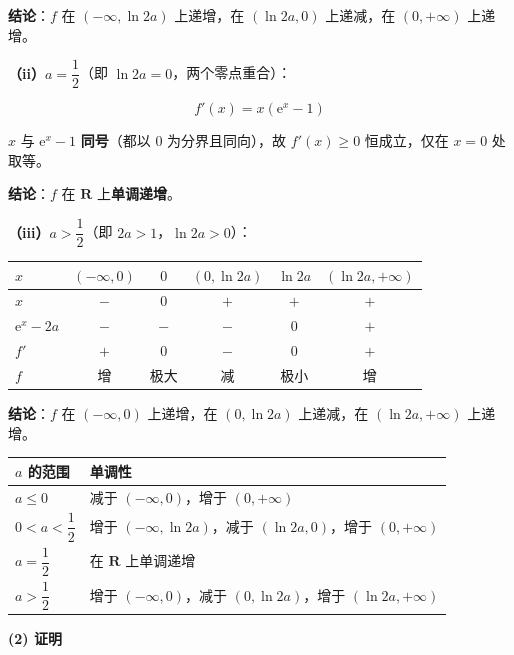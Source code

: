 \textbf{结论}：$f$ 在 $(-\infty,\ln2a)$ 上递增，在 $(\ln2a,0)$ 上递减，在 $(0,+\infty)$ 上递增。

\textbf{（ii）$a=\dfrac12$}（即 $\ln2a=0$，两个零点重合）：

\[f'(x)=x\left(\mathrm e^{x}-1\right)\]

$x$ 与 $\mathrm e^{x}-1$ \textbf{同号}（都以 $0$ 为分界且同向），故 $f'(x)\ge0$ 恒成立，仅在 $x=0$ 处取等。

\textbf{结论}：$f$ 在 $\mathbf R$ 上\textbf{单调递增}。

\textbf{（iii）$a>\dfrac12$}（即 $2a>1$，$\ln2a>0$）：

\begin{center}
\begin{tabular}{lccccc}
\toprule
$x$ & $(-\infty,0)$ & $0$ & $(0,\ln2a)$ & $\ln2a$ & $(\ln2a,+\infty)$ \\
\midrule
$x$ & $-$ & $0$ & $+$ & $+$ & $+$ \\
$\mathrm e^{x}-2a$ & $-$ & $-$ & $-$ & $0$ & $+$ \\
$f'$ & $+$ & $0$ & $-$ & $0$ & $+$ \\
$f$ & 增 & 极大 & 减 & 极小 & 增 \\
\bottomrule
\end{tabular}
\end{center}

\textbf{结论}：$f$ 在 $(-\infty,0)$ 上递增，在 $(0,\ln2a)$ 上递减，在 $(\ln2a,+\infty)$ 上递增。

\par\medskip


\begin{center}
\begin{tabular}{ll}
\toprule
$a$ 的范围 & 单调性 \\
\midrule
$a\le0$ & 减于 $(-\infty,0)$，增于 $(0,+\infty)$ \\
$0<a<\dfrac12$ & 增于 $(-\infty,\ln2a)$，减于 $(\ln2a,0)$，增于 $(0,+\infty)$ \\
$a=\dfrac12$ & 在 $\mathbf R$ 上单调递增 \\
$a>\dfrac12$ & 增于 $(-\infty,0)$，减于 $(0,\ln2a)$，增于 $(\ln2a,+\infty)$ \\
\bottomrule
\end{tabular}
\end{center}

\par\medskip

\textbf{(2) 证明}

